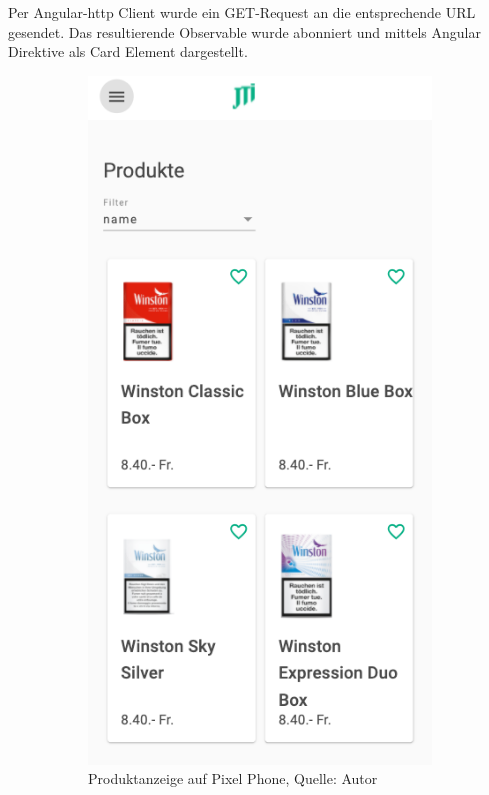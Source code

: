 Per Angular-http Client wurde ein GET-Request an die entsprechende URL gesendet. Das resultierende Observable wurde abonniert und mittels Angular Direktive als Card Element dargestellt. 

\begin{figure}[H]
	\begin{subfigure}[b]{0.5\textwidth}
		\includegraphics[scale=0.5]{images/productsPhone.PNG}
		\caption[Produktanzeige auf Pixel Phone]{Produktanzeige auf Pixel Phone, Quelle: Autor}
		\label{img: Prodcuts pixel}
	\end{subfigure}
	\hfill
	\begin{subfigure}[b]{0.5\textwidth}

\end{subfigure}
\end{figure}
